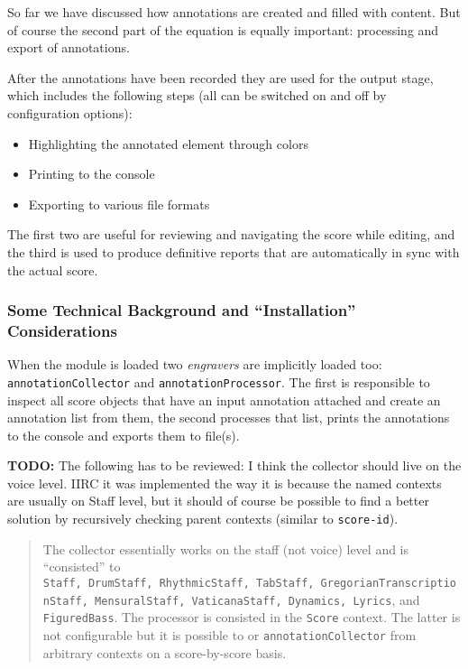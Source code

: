 \documentclass[]{ollmanual}
\providecommand{\tightlist}{%
  \setlength{\itemsep}{0pt}\setlength{\parskip}{0pt}}
\begin{document}
So far we have discussed how annotations are created and filled with
content. But of course the second part of the equation is equally
important: processing and export of annotations.

After the annotations have been recorded they are used for the output
stage, which includes the following steps (all can be switched on and
off by configuration options):

\begin{itemize}
\tightlist
\item
  Highlighting the annotated element through colors
\item
  Printing to the console
\item
  Exporting to various file formats
\end{itemize}

The first two are useful for reviewing and navigating the score while
editing, and the third is used to produce definitive reports that are
automatically in sync with the actual score.

\hypertarget{some-technical-background-and-installation-considerations}{%
\subsubsection{Some Technical Background and ``Installation''
Considerations}\label{some-technical-background-and-installation-considerations}}

When the  module is loaded two
\emph{engravers} are implicitly loaded too: \texttt{annotationCollector}
and \texttt{annotationProcessor}. The first is responsible to inspect
all score objects that have an input annotation attached and create an
annotation list from them, the second processes that list, prints the
annotations to the console and exports them to file(s).

\textbf{TODO:} The following has to be reviewed: I think the collector
should live on the voice level. IIRC it was implemented the way it is
because the named contexts are usually on Staff level, but it should of
course be possible to find a better solution by recursively checking
parent contexts (similar to \texttt{score-id}).

\begin{quote}
The collector essentially works on the staff (not voice) level and is
``consisted'' to
\texttt{Staff,\ DrumStaff,\ RhythmicStaff,\ TabStaff,\ GregorianTranscriptionStaff,\ MensuralStaff,\ VaticanaStaff,\ Dynamics,\ Lyrics},
and \texttt{FiguredBass}. The processor is consisted in the
\texttt{Score} context. The latter is not configurable but it is
possible to  or 
\texttt{annotationCollector} from arbitrary contexts on a score-by-score
basis.
\end{quote}
\end{document}
